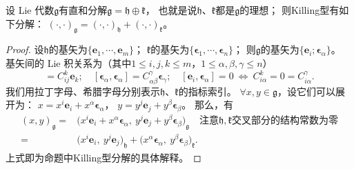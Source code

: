\begin{proposition}\label{chlg:thm_Killing-oplus}
    设 Lie 代数$\mathfrak{g}$有直和分解$\mathfrak{g}=\mathfrak{h}\oplus\mathfrak{k}$，
    也就是说$\mathfrak{h}$、$\mathfrak{k}$都是$\mathfrak{g}$的理想；
    则Killing型有如下分解：
    $(\cdot,\cdot)_{\mathfrak{g}}=(\cdot,\cdot)_{\mathfrak{h}}+(\cdot,\cdot)_{\mathfrak{k}}$。
\end{proposition}
\begin{proof}
    设$\mathfrak{h}$的基矢为$\{\boldsymbol{e}_1,\cdots,\boldsymbol{e}_m\}$；
    $\mathfrak{k}$的基矢为$\{\boldsymbol{\epsilon}_1,\cdots,\boldsymbol{\epsilon}_n\}$；
    则$\mathfrak{g}$的基矢为$\{\boldsymbol{e}_i;\boldsymbol{\epsilon}_\alpha\}$。
    基矢间的 Lie 积关系为（其中$1\leqslant i,j,k \leqslant m$，$1\leqslant \alpha,\beta,\gamma \leqslant n$）
    \begin{equation*}
        [\boldsymbol{e}_i,\boldsymbol{e}_j]=C_{ij}^k \boldsymbol{e}_k;\quad
        [\boldsymbol{\epsilon}_\alpha,\boldsymbol{\epsilon}_\alpha]=C_{\alpha\beta}^\gamma \boldsymbol{\epsilon}_\gamma;\quad
        [\boldsymbol{e}_i,\boldsymbol{\epsilon}_\alpha]=0   \  \Leftrightarrow \ 
        C_{i\alpha}^k=0=C_{i\alpha}^\gamma.
    \end{equation*}
    我们用拉丁字母、希腊字母分别表示$\mathfrak{h}$、$\mathfrak{k}$的指标索引。
    $\forall x,y \in \mathfrak{g}$，设它们可以展开为：
    $x= x^i \boldsymbol{e}_i + x^\alpha \boldsymbol{\epsilon}_\alpha$，
    $y= y^j \boldsymbol{e}_j + y^\beta \boldsymbol{\epsilon}_\beta$。
    那么，有
    \begin{align*}
        (x,y)_{\mathfrak{g}}=& \bigl(x^i \boldsymbol{e}_i + x^\alpha \boldsymbol{\epsilon}_\alpha,\ 
         y^j \boldsymbol{e}_j + y^\beta \boldsymbol{\epsilon}_\beta\bigr)_{\mathfrak{g}}\quad
         \text{注意}\mathfrak{h},\mathfrak{k}\text{交叉部分的结构常数为零}\\
         =&\bigl(x^i\boldsymbol{e}_i ,\ y^j\boldsymbol{e}_j \bigr)_{\mathfrak{h}}
         + \bigl(x^\alpha\boldsymbol{\epsilon}_\alpha,\ y^\beta\boldsymbol{\epsilon}_\beta\bigr)_{\mathfrak{k}} .
    \end{align*}
    上式即为命题中Killing型分解的具体解释。
\end{proof}


